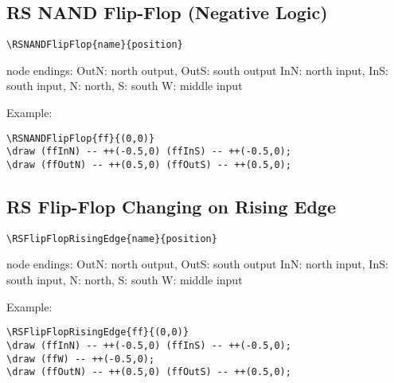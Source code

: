 \documentclass[parskip=full]{scrartcl}
\begin{document}
\subsection{RS NAND Flip-Flop (Negative Logic)}

\begin{verbatim}
\RSNANDFlipFlop{name}{position}
\end{verbatim}
node endings: OutN: north output, OutS: south output
              InN: north input, InS: south input,
              N: north, S: south
              W: middle input

Example:\\
\begin{minipage}{0.8\textwidth}
\begin{verbatim}
\RSNANDFlipFlop{ff}{(0,0)}
\draw (ffInN) -- ++(-0.5,0) (ffInS) -- ++(-0.5,0);
\draw (ffOutN) -- ++(0.5,0) (ffOutS) -- ++(0.5,0);
\end{verbatim}
\end{minipage}
\begin{minipage}{0.19\textwidth}
\end{minipage}

\subsection{RS Flip-Flop Changing on Rising Edge}

\begin{verbatim}
\RSFlipFlopRisingEdge{name}{position}
\end{verbatim}
node endings: OutN: north output, OutS: south output
              InN: north input, InS: south input,
              N: north, S: south
              W: middle input

Example:\\
\begin{minipage}{0.8\textwidth}
\begin{verbatim}
\RSFlipFlopRisingEdge{ff}{(0,0)}
\draw (ffInN) -- ++(-0.5,0) (ffInS) -- ++(-0.5,0);
\draw (ffW) -- ++(-0.5,0);
\draw (ffOutN) -- ++(0.5,0) (ffOutS) -- ++(0.5,0);
\end{verbatim}
\end{minipage}
\begin{minipage}{0.19\textwidth}
\end{minipage}
\end{document}
